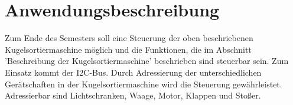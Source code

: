 \section{Anwendungsbeschreibung}
Zum Ende des Semesters soll eine Steuerung der oben beschriebenen Kugelsortiermaschine möglich und die Funktionen, die im Abschnitt 'Beschreibung der Kugelsortiermaschine' beschrieben sind steuerbar sein. Zum Einsatz kommt der I2C-Bus. Durch Adressierung der unterschiedlichen Gerätschaften in der Kugelsortiermaschine wird die Steuerung gewährleistet. Adressierbar sind Lichtschranken, Waage, Motor, Klappen und Stoßer.
